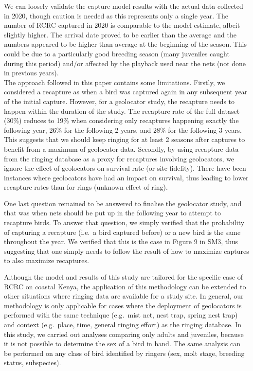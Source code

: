 \documentclass[]{interact}
\theoremstyle{plain}%
\theoremstyle{definition}
\theoremstyle{remark}
\begin{document}
We can loosely validate the capture model results with the actual data
collected in 2020, though caution is needed as this represents only a
single year. The number of RCRC captured in 2020 is comparable to the
model estimate, albeit slightly higher. The arrival date proved to be
earlier than the average and the numbers appeared to be higher than
average at the beginning of the season. This could be due to a
particularly good breeding season (many juveniles caught during this
period) and/or affected by the playback used near the nets (not done in
previous years).\\
The approach followed in this paper contains some limitations. Firstly,
we considered a recapture as when a bird was captured again in any
subsequent year of the initial capture. However, for a geolocator study,
the recapture needs to happen within the duration of the study. The
recapture rate of the full dataset (30\%) reduces to 19\% when
considering only recaptures happening exactly the following year, 26\%
for the following 2 years, and 28\% for the following 3 years. This
suggests that we should keep ringing for at least 2 seasons after
captures to benefit from a maximum of geolocator data. Secondly, by
using recapture data from the ringing database as a proxy for recaptures
involving geolocators, we ignore the effect of geolocators on survival
rate (or site fidelity). There have been instances where geolocators
have had an impact on survival, thus leading to lower recapture rates
than for rings (unknown effect of ring).

One last question remained to be answered to finalise the geolocator
study, and that was when nets should be put up in the following year to
attempt to recapture birds. To answer that question, we simply verified
that the probability of capturing a recapture (i.e.~a bird captured
before) or a new bird is the same throughout the year. We verified that
this is the case in Figure 9 in SM3, thus suggesting that one simply
needs to follow the result of how to maximize captures to also maximize
recaptures.

Although the model and results of this study are tailored for the
specific case of RCRC on coastal Kenya, the application of this
methodology can be extended to other situations where ringing data are
available for a study site. In general, our methodology is only
applicable for cases where the deployment of geolocators is performed
with the same technique (e.g.~mist net, nest trap, spring nest trap) and
context (e.g.~place, time, general ringing effort) as the ringing
database. In this study, we carried out analyses comparing only adults
and juveniles, because it is not possible to determine the sex of a bird
in hand. The same analysis can be performed on any class of bird
identified by ringers (sex, molt stage, breeding status, subspecies).
\end{document}
